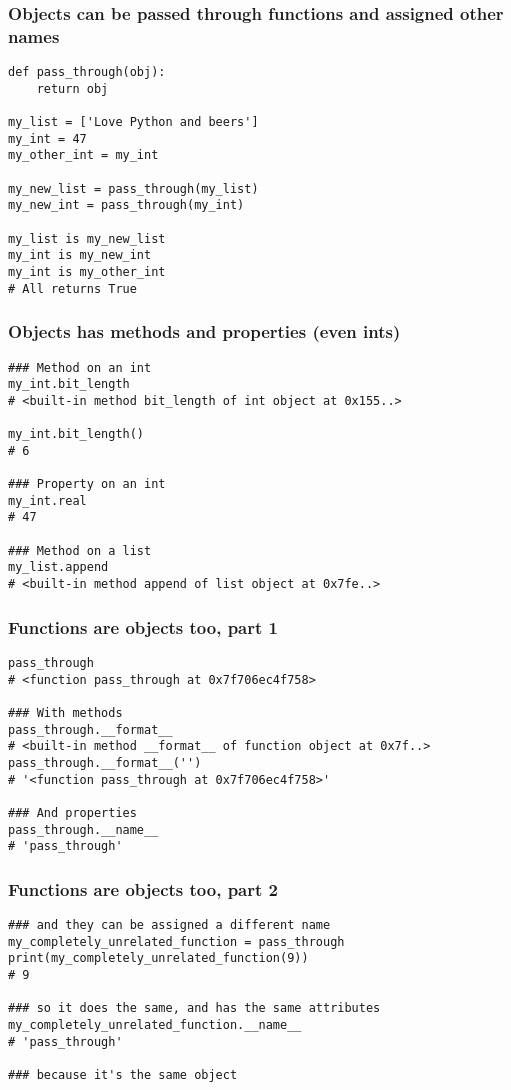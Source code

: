 \documentclass{beamer}
\begin{document}
\begin{frame}[fragile]
  \frametitle{Objects can be passed through functions and assigned other names}
\begin{verbatim}
def pass_through(obj):
    return obj

my_list = ['Love Python and beers']
my_int = 47
my_other_int = my_int

my_new_list = pass_through(my_list)
my_new_int = pass_through(my_int)

my_list is my_new_list
my_int is my_new_int
my_int is my_other_int
# All returns True
\end{verbatim}
\end{frame}

\begin{frame}[fragile]
  \frametitle{Objects has methods and properties (even ints)}
\begin{verbatim}
### Method on an int
my_int.bit_length
# <built-in method bit_length of int object at 0x155..>

my_int.bit_length()
# 6

### Property on an int
my_int.real
# 47

### Method on a list
my_list.append
# <built-in method append of list object at 0x7fe..>
\end{verbatim}
\end{frame}

\begin{frame}[fragile]
  \frametitle{Functions are objects too, part 1}
\begin{verbatim}
pass_through
# <function pass_through at 0x7f706ec4f758>

### With methods
pass_through.__format__
# <built-in method __format__ of function object at 0x7f..>
pass_through.__format__('')
# '<function pass_through at 0x7f706ec4f758>'

### And properties
pass_through.__name__
# 'pass_through'
\end{verbatim}
\end{frame}

\begin{frame}[fragile]
  \frametitle{Functions are objects too, part 2}
\begin{verbatim}
### and they can be assigned a different name
my_completely_unrelated_function = pass_through
print(my_completely_unrelated_function(9))
# 9

### so it does the same, and has the same attributes
my_completely_unrelated_function.__name__
# 'pass_through'

### because it's the same object
\end{verbatim}
\end{frame}
\end{document}
